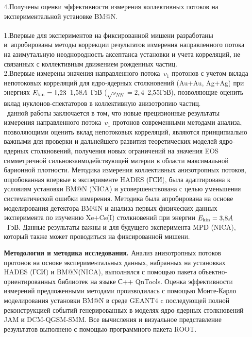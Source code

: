 4.\;Получены оценки эффективности измерения коллективных потоков на экспериментальной установке BM@N.\\
\novelty\\
1.\;Впервые для экспериментов на фиксированной мишени разработаны и~апробированы методы коррекции результатов измерения направленного потока на азимутальную неоднородность аксептанса установки и учета корреляций, не связанных с  коллективным движением рожденных частиц.\\
2.\;Впервые измерены значения направленного потока~$v_1$ протонов с учетом вклада непотоковых корреляций для ядро-ядерных столкновений (Au$+$Au, Ag$+$Ag) при энергиях $E_{\rm kin} = 1{,}23$--1,58$A$~ГэВ ($\sqrt{s_{NN}}=2{,}4$--2,55\;ГэВ), позволяющие оценить вклад нуклонов-спектаторов в коллективную анизотропию частиц.\\
\influence\ данной работы заключается в том, что новые прецизионные результаты измерения направленного потока~$v_1$ протонов современными методами анализа, позволяющими оценить вклад непотоковых корреляций, являются принципиально важными для проверки и дальнейшего развития теоретических моделей ядро-ядерных столкновений, получения новых ограничений на значения EOS симметричной сильновзаимодействующей материи в области максимальной барионной плотности.
Методика измерения коллективных анизотропных потоков, опробованная впервые в эксперименте HADES (ГСИ), была адаптирована к условиям установки BM@N (NICA) и усовершенствована с целью уменьшения систематической ошибки измерения. Методика была апробирована на основе моделирования детектора BM@N и анализа первых физических данных эксперимента по изучению Xe$+$Cs(I) столкновений при энергии $E_{\rm kin} = 3{,}8A$~ГэВ.  
Данные результаты важны и  для будущего эксперимента MPD (NICA), который также может проводиться на фиксированной мишени.

\textbf{Методология и методика исследования.}
Анализ анизотропных потоков протонов на  основе экспериментальных данных, набранных на установках HADES (ГСИ) и BM@N(NICA), выполнялся с помощью пакета  объектно-ориентированных библиотек на языке С++ QnTools. 
Оценка эффективности измерений предложенными методами производилась с помощью Монте-Карло моделирования установки BM@N в среде GEANT4 c последующей полной реконструкцией событий генерированных в моделях ядро-ядерных столкновений JAM и DCM-QGSM-SMM.
Все вычисления и визуальное представление результатов выполнено с помощью программного пакета ROOT.

